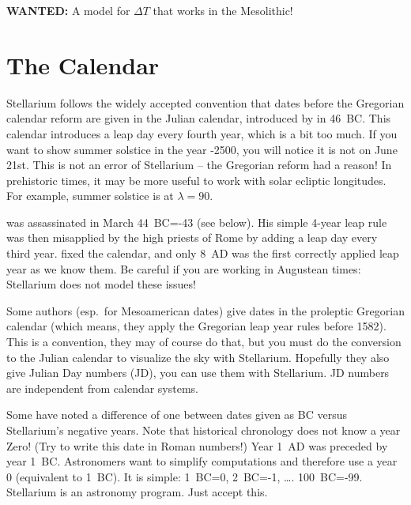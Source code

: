 \textbf{WANTED:} A model for $\Delta T$ that works in the Mesolithic! 

\section{The Calendar}
\label{sec:Accuracy:Calendar}

Stellarium follows the widely accepted convention that dates before the Gregorian calendar 
reform are given in the Julian calendar, introduced by  in 46~BC. 
This calendar introduces a leap day every fourth year, which is a bit too much. 
If you want to show summer solstice in the year -2500, you will notice it is not on June 21st. 
This is not an error of Stellarium -- the Gregorian reform had a reason! In prehistoric times, 
it may be more useful to work with solar ecliptic longitudes. For example, summer solstice is at $\lambda=90$.

 was assassinated in March 44~BC=-43 (see below). 
His simple 4-year leap rule was then misapplied by the high priests of Rome by adding a leap day every third year. 
 fixed the calendar, and only 8~AD was the 
first correctly applied leap year as we know them. Be careful if you are working in Augustean times: 
Stellarium does not model these issues!

Some authors (esp.\ for Mesoamerican dates) give dates in the proleptic Gregorian calendar 
(which means, they apply the Gregorian leap year rules before 1582). This is a convention, they may of course do that, 
but you must do the conversion to the Julian calendar to visualize the sky with Stellarium. 
Hopefully they also give Julian Day numbers (JD), you can use them with Stellarium. 
JD numbers are independent from calendar systems. 

Some have noted a difference of one between dates given as BC versus Stellarium's negative years. 
Note that historical chronology does not know a year Zero! (Try to write this date in Roman numbers!) 
Year 1~AD was preceded by year 1~BC. Astronomers want to simplify computations and therefore 
use a year 0 (equivalent to 1~BC). It is simple: 1~BC=0, 2~BC=-1, \ldots. 100~BC=-99. 
Stellarium is an astronomy program. Just accept this.






